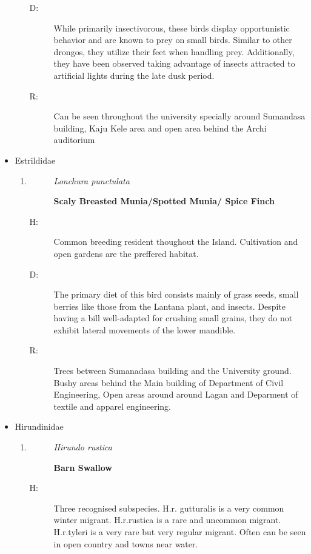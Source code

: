 \begin{itemize}
\begin{enumerate}
\begin{description}
\item[D: ]%
While primarily insectivorous, these birds display opportunistic behavior and are known to prey on small birds. Similar to other drongos, they utilize their feet when handling prey. Additionally, they have been observed taking advantage of insects attracted to artificial lights during the late dusk period.%
\item[R: ]%
Can be seen throughout the university specially around Sumandasa building, Kaju Kele area and open area behind the Archi auditorium%
\end{description}%
\end{enumerate}%
\item%
Estrildidae%
\begin{enumerate}%
\item%
\begin{description}%
\item[]%
\textit{Lonchura punctulata}%
\item[]%
\textbf{Scaly Breasted Munia/Spotted Munia/ Spice Finch}%
\end{description}%
\begin{description}%
\item[H: ]%
Common breeding resident thoughout the Island. Cultivation and open gardens are the preffered habitat.%
\item[D: ]%
The primary diet of this bird consists mainly of grass seeds, small berries like those from the Lantana plant, and insects. Despite having a bill well{-}adapted for crushing small grains, they do not exhibit lateral movements of the lower mandible.%
\item[R: ]%
Trees between Sumanadasa building and the University ground. Bushy areas behind the Main building of Department of Civil Engineering, Open areas around around Lagan and Deparment of textile and apparel engineering.%
\end{description}%
\end{enumerate}%
\item%
Hirundinidae%
\begin{enumerate}%
\item%
\begin{description}%
\item[]%
\textit{Hirundo rustica}%
\item[]%
\textbf{Barn Swallow}%
\end{description}%
\begin{description}%
\item[H: ]%
Three recognised subspecies. H.r. gutturalis is a very common winter migrant. H.r.rustica is a rare and uncommon migrant. H.r.tyleri is a very rare but very regular migrant. Often can be seen in open country and towns near water.%

\end{description}
\end{enumerate}
\end{itemize}
